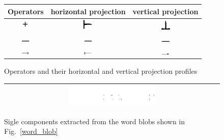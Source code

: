 \documentclass[12pt]{IEEEtran}
\begin{document}
\begin{itemize}
\begin{figure}[htb]\center\footnotesize
\begin{tabular}{|c|c|c|}
\hline
Operators & horizontal projection & vertical projection\\ \hline
\includegraphics[width=0.2in, height=0.2in]{plus.png} &
 \includegraphics[width=0.2in,height=0.2in ]{plusH.png} & 
\includegraphics[width=0.2in,height=0.2in]{plusV.png}\\ \hline
\includegraphics[width=0.2in, height=0.02in]{minus.png} &
 \includegraphics[width=0.2in,height=0.02in ]{minusH.png} & 
\includegraphics[width=0.2in,height=0.02in]{minusV.png}\\ \hline
\includegraphics[width=0.2in, height=0.05in]{arrow.png} &
 \includegraphics[width=0.2in,height=0.05in ]{arrowH.png} & 
\includegraphics[width=0.2in,height=0.05in]{arrowV.png}\\ \hline
\end{tabular} 
 \caption{Operators and their horizontal and vertical projection profiles}
 \label{h_v_profile}
\end{figure}
\begin{figure}[h]\center\footnotesize
\begin{tabular}{|c|}\hline
 \includegraphics[width=0.42\textwidth]{singleChar.png} \\\hline
 \end{tabular} 
 \caption{Sigle components extracted from the word blobs shown in Fig.~\ref{word_blob}}
 \label{single_char}
\end{figure}


\end{itemize}
\end{document}
